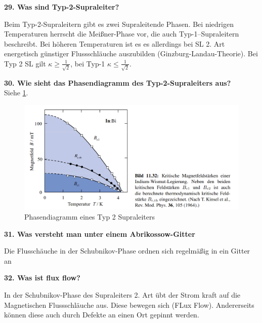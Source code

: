 \noindent\textbf{29. Was sind Typ-2-Supraleiter?}\\
\begin{addmargin}[25pt]{0pt}
Beim Typ-2-Supraleitern gibt es zwei Supraleitende Phasen. Bei niedrigen Temperaturen herrscht die Meißner-Phase vor, die auch Typ-1--Supraleitern beschreibt. Bei höheren Temperaturen ist es es allerdings bei SL 2. Art energetisch günstiger Flussschläuche auszubilden (Ginzburg-Landau-Theorie). Bei Typ 2 SL gilt $\kappa \geq \frac{1}{\sqrt{2}}$, bei Typ-1 $\kappa \leq \frac{1}{\sqrt{2}}$.\\
\end{addmargin}

\noindent\textbf{30. Wie sieht das Phasendiagramm des Typ-2-Supraleiters aus?}\\
Siehe \ref{fig:PhaseTyp2SL}.
\begin{addmargin}[25pt]{0pt}
\begin{figure}[!h]
    \centering
    \includegraphics[width=0.7\linewidth]{images//KM2/SL_2Art_Phasen.PNG}
    \caption{Phasendiagramm eines Typ 2 Supraleiters}
    \label{fig:PhaseTyp2SL}
\end{figure} 
\end{addmargin}

\noindent\textbf{31. Was versteht man unter einem Abrikossow-Gitter}\\
\begin{addmargin}[25pt]{0pt}
Die Flusschäuche in der Schubnikov-Phase ordnen sich regelmäßig in ein Gitter an\\
\end{addmargin}

\noindent\textbf{32. Was ist flux flow?}\\
\begin{addmargin}[25pt]{0pt}
In der Schubnikov-Phase des Supraleiters 2. Art übt der Strom kraft auf die Magnetischen Flussschläuche aus. Diese bewegen sich (FLux Flow). Andererseits können diese auch durch Defekte an einen Ort gepinnt werden.\\
\end{addmargin}